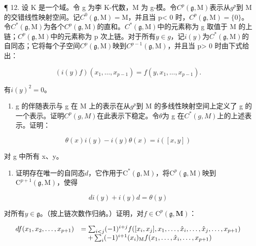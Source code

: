 ¶ 12. 设 K 是一个域。令 g 为李 K-代数，M 为 g-模。令\(C^{p}(\mathfrak{g}, \mathrm{M})\)表示从\(g^{p}\)到 M 的交错线性映射空间。记\(C^{0}(\mathfrak{g}, \mathrm{M}) = \mathrm{M}\)，并且当 p\textless{} 0 时，\(C^{p}(\mathfrak{g}, \mathrm{M}) = \{0\}\)。令\(C^{*}(\mathfrak{g}, \mathrm{M})\)为各个\(C^{p}(\mathfrak{g}, \mathrm{M})\)的直和。\(C^{*}(\mathfrak{g}, \mathrm{M})\)中的元素称为 g 取值于 M 的上链；\(C^{p}(\mathfrak{g}, \mathrm{M})\)中的元素称为 p 次上链。对于所有\(y \in g\)，记\(i(y)\)为\(C^{*}(\mathfrak{g}, \mathrm{M})\)的自同态；它将每个子空间\(C^{p}(\mathfrak{g}, \mathrm{M})\)映到\(C^{p-1}(\mathfrak{g}, \mathrm{M})\)，并且当 p\textgreater{} 0 时由下式给出：

\[
(i (y) f) \left(x _ {1}, \dots , x _ {p - 1}\right) = f \left(y, x _ {1}, \dots , x _ {p - 1}\right).\tag{1}
\]

有\(i(y)^{2}=0\)。

\begin{enumerate}
\def\labelenumi{(\alph{enumi})}
\tightlist
\item
  g 的伴随表示与 g 在 M 上的表示在从\(g^{p}\)到 M 的多线性映射空间上定义了 g 的一个表示。证明\(C^{p}(g, M)\)在此表示下稳定。令\(\theta\)为 g 在\(C^{*}(g, M)\)上的上述表示。证明：
\end{enumerate}

\[
\theta (x) i (y) - i (y) \theta (x) = i ([ x, y ])
\]

对 g 中所有 x、y。

\begin{enumerate}
\def\labelenumi{(\alph{enumi})}
\setcounter{enumi}{1}
\tightlist
\item
  证明存在唯一的自同态\(d\)，它作用于\(\mathrm{C}^*(\mathfrak{g},\mathrm{M})\)，将\(\mathrm{C}^p (\mathfrak{g},\mathrm{M})\)映到\(\mathrm{C}^{p + 1}(\mathfrak{g},\mathrm{M})\)，使得
\end{enumerate}

\[
d i (y) + i (y) d = \theta (y)\tag{3}
\]

对所有\(y \in \mathfrak{g}\)。（按上链次数作归纳。）证明，对\(f \in \mathrm{C}^p(\mathfrak{g}, \mathbf{M})\)：

\[
\begin{array}{r l} d f (x _ {1}, x _ {2}, \dots , x _ {p + 1}) & = \sum_ {i <   j} (- 1) ^ {i + j} f ([ x _ {i}, x _ {j} ], x _ {1}, \dots , \hat {x} _ {i}, \dots , \hat {x} _ {j}, \dots , x _ {p + 1}) \\ & \quad + \sum_ {i} (- 1) ^ {i + 1} (x _ {i}) _ {\mathrm{M}} f (x _ {1}, \dots , \hat {x} _ {i}, \dots , x _ {p + 1}) \end{array}
\]

